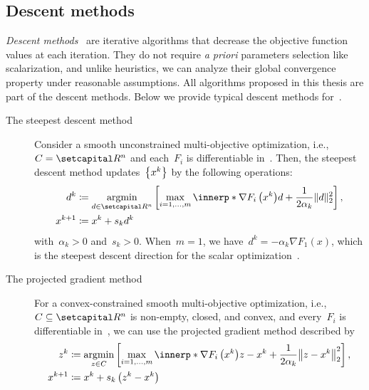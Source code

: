 \documentclass[../../main]{subfiles}
\begin{document}
\subsection{Descent methods} 
\emph{Descent methods}~\cite{Fukuda2014} are iterative algorithms that decrease the objective function values at each iteration.
They do not require \emph{a priori} parameters selection like scalarization, and unlike heuristics, we can analyze their global convergence property under reasonable assumptions.
All algorithms proposed in this thesis are part of the descent methods.
Below we provide typical descent methods for~.

\begin{example} 
    \begin{description}
        \item[The steepest descent method~\cite{Fliege2000}] Consider a smooth unconstrained multi-objective optimization, i.e.,~$C = \setR^n$ and each~$F_i$ is differentiable in~.
            Then, the steepest descent method updates~$\set*{x^k}$ by the following operations:
            \begin{align} \label{eq:steepest_descent}
                d^k &\coloneqq \argmin_{d \in \setR^n} \left[ \max_{i = 1, \dots, m} \innerp*{\nabla F_i\left(x^k\right)}{d} + \frac{1}{2 \alpha_k} \norm{d}_2^2 \right], \\
                x^{k + 1} &\coloneqq x^k + s_k d^k
            \end{align}
            with~$\alpha_k > 0$ and~$s_k > 0$.
            When~$m = 1$, we have~$d^k = - \alpha_k \nabla F_1(x)$, which is the steepest descent direction for the scalar optimization~\cite{Cauchy1847}.
        \item[The projected gradient method~\cite{Grana-Drummond2004,Fukuda2013}] For a convex-constrained smooth multi-objective optimization, i.e.,~$C \subseteq \setR^n$ is non-empty, closed, and convex, and every~$F_i$ is differentiable in~, we can use the projected gradient method described by
            \begin{equation} \label{eq:proj_grad}
                \begin{aligned} 
                    z^k &\coloneqq \argmin_{z \in C} \left[ \max_{i = 1, \dots, m} \innerp*{\nabla F_i\left(x^k\right)}{z - x^k} + \frac{1}{2 \alpha_k} \norm*{z - x^k}_2^2 \right], \\
                    x^{k + 1} &\coloneqq x^k + s_k \left(z^k - x^k \right)

\end{aligned}
\end{equation}
\end{description}
\end{example}
\end{document}
